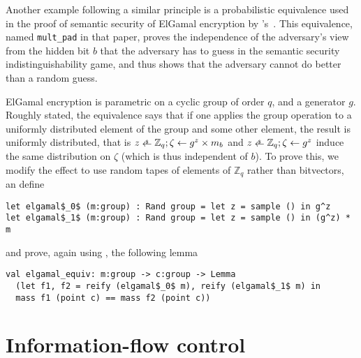 \documentclass[sigplan,screen]{acmart}\settopmatter{}
\newcommand\citepos[1]{\citeauthor{#1}'s\ \citeyear{#1}}
\newcommand{\Rand}[2]{#1 \stackrel{\raisebox{-.25ex}[.25ex]%
   {\tiny $\mathdollar$}}{\raisebox{-.2ex}[.2ex]{$\leftarrow$}} #2}
\newcommand{\zq}{\mathbb{Z}_q}
\newcommand{\Return}{\mathsf{return}}
\begin{document}
Another example following a similar principle is a probabilistic
equivalence used in the proof of semantic security of ElGamal
encryption by \citepos{BartheGB09}. This equivalence, named
\texttt{mult\_pad} in that paper, proves the independence of the
adversary's view from the hidden bit $b$ that the adversary has to
guess in the semantic security indistinguishability game, and thus
shows that the adversary cannot do better than a random guess.

ElGamal encryption is parametric on a cyclic group of order $q$, and a
generator $g$.
%
%
Roughly stated, the equivalence says that if one applies the group
operation to a uniformly distributed element of the group and some
other element, the result is uniformly distributed, that is
%
$\Rand{z}{\zq}; \zeta \leftarrow g^z \times m_b$
and
$\Rand{z}{\zq}; \zeta \leftarrow g^z$
%
induce the same distribution on $\zeta$ (which is thus independent of
$b$).
%
To prove this, we modify the  effect
to use random tapes of elements of $\zq$ rather than bitvectors, an define
%
\begin{lstlisting}
let elgamal$_0$ (m:group) : Rand group = let z = sample () in g^z
let elgamal$_1$ (m:group) : Rand group = let z = sample () in (g^z) * m
\end{lstlisting}
%
and prove, again using , the following lemma
%
\begin{lstlisting}
val elgamal_equiv: m:group -> c:group -> Lemma
  (let f1, f2 = reify (elgamal$_0$ m), reify (elgamal$_1$ m) in 
  mass f1 (point c) == mass f2 (point c))
\end{lstlisting}

\fi


\section{Information-flow control}
\label{sec:ifc}
\end{document}
